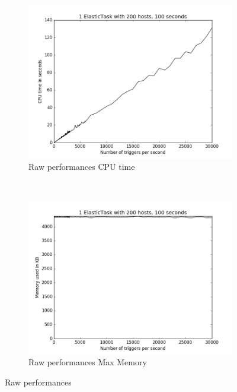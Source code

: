 \documentclass[a4paper, onecolumn, 11pt]{article}
\begin{document}
    \begin{figure}
    	\centering
    	\hspace*{-4em}
    	\begin{subfigure}[t]{0.6\textwidth}
    		\includegraphics[width=\textwidth]{../plots/raw_perf_oneet_time}
    		\caption{Raw performances CPU time}
    		\label{time_oneet_raw}
    	\end{subfigure}%
    	~
    	\begin{subfigure}[t]{0.6\textwidth}
    		\includegraphics[width=\textwidth]{../plots/raw_perf_oneet_mem}
    		\caption{Raw performances Max Memory}
    		\label{mem_oneet_raw}
    	\end{subfigure}%
    	\caption{Raw performances}
    \end{figure}
    
\end{document}
